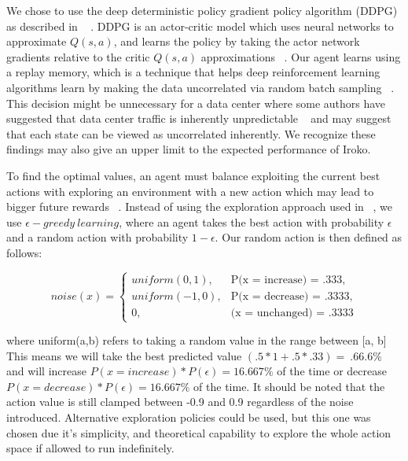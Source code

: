 We chose to use the deep deterministic policy gradient policy algorithm (DDPG) as described in ~\cite{DDPG} . DDPG is an actor-critic model which uses neural networks to approximate $Q(s,a)$, and learns the policy by taking the actor network gradients relative to the critic $Q(s,a)$ approximations ~\cite{DDPG}.  Our agent learns using a replay memory, which is a technique that helps deep reinforcement learning algorithms learn by making the data uncorrelated via random batch sampling ~\cite{DQLearning}. This decision might be unnecessary for a data center where some authors have suggested that data center traffic is inherently unpredictable ~\cite{microte} and may suggest that each state can be viewed as uncorrelated inherently. We recognize these findings may also give an upper limit to the expected performance of Iroko. 

To find the optimal values, an agent must balance exploiting the current best actions with exploring an environment with a new action which may lead to bigger future rewards ~\cite{Sutton:1998:IRL:551283}. Instead of using the exploration approach used in ~\cite{DDPG}, we use $\epsilon-greedy\ learning$, where an agent takes the best action with probability $\epsilon$ and a random action with probability $1 - \epsilon$. Our random action is then defined as follows:

\[
noise(x) = 
\begin{cases}

uniform(0,1), &\text{P(x = increase) = .333},\\
uniform(-1,0), &\text{P(x = decrease) = .3333},\\
0, & \text{(x = unchanged) = .3333}
\end{cases}
\]

where uniform(a,b) refers to taking a random value in the range between [a, b]
This means we will take the best predicted value $(.5 * 1 + .5 * .33) =  ~.66.6\%$  and will increase $P(x= increase) * P(\epsilon) = 16. 667\%$ of the time or decrease $P(x= decrease) * P(\epsilon) = 16. 667\%$ of the time. It should be noted that the action value is still clamped between -0.9 and 0.9 regardless of the noise introduced. Alternative exploration policies could be used, but this one was chosen due it’s simplicity, and theoretical capability to explore the whole action space if allowed to run indefinitely.
